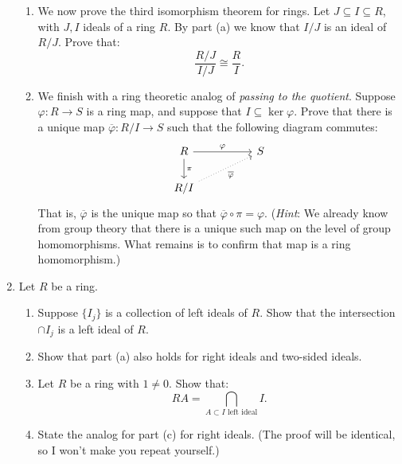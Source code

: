 \documentclass[11pt]{article}
\begin{document}
\begin{enumerate}
{\begin{enumerate}
{\begin{enumerate}
      \item{If $A$ is a subring of $R$, then $I$ is an ideal of $A$ and that $A/I\cong\overline A$.}
      \item{$A$ is a left ideal of $R$ if and only if $\overline A$ is a left ideal of $R/I$.}
      \item{$A$ is a right ideal of $R$ if and only if $\overline A$ is a right ideal of $R/I$.}
      \item{$A$ is an ideal of $R$ if and only if $\overline A$ is an ideal of $R/I$.}
    \end{enumerate}
    }
    \item{We now prove the third isomorphism theorem for rings.  Let $J\subseteq I\subseteq R$, with $J,I$ ideals of a ring $R$.  By part (a) we know that $I/J$ is an ideal of $R/J$.  Prove that:
    \[\frac{R/J}{I/J}\cong\frac{R}{I}.\]
    }
    \item{We finish with a ring theoretic analog of \textit{passing to the quotient}.  Suppose $\varphi:R\to S$ is a ring map, and suppose that $I\subseteq\ker\varphi$.  Prove that there is a unique map $\overline\varphi:R/I\to S$ such that the following diagram commutes:
    \[
    \begin{tikzcd}
      R\ar[rr,"\varphi"]\ar[d,"\pi"]&&S\\
      R/I\ar[urr,dotted,swap,"\overline\varphi"]&&
    \end{tikzcd}
    \]
    That is, $\overline\varphi$ is the unique map so that $\overline\varphi\circ\pi=\varphi$.  (\textit{Hint}: We already know from group theory that there is a unique such map on the level of group homomorphisms.  What remains is to confirm that map is a ring homomorphism.)
    }
  \end{enumerate}
  }
  \item{
  Let $R$ be a ring.
  \begin{enumerate}
    \item{
    Suppose $\{I_j\}$ is a collection of left ideals of $R$.  Show that the intersection $\cap I_j$ is a left ideal of $R$.
    }
    \item{
    Show that part (a) also holds for right ideals and two-sided ideals.
    }
    \item{
    Let $R$ be a ring with $1\not=0$.  Show that:
    \[RA = \bigcap_{A\subset I\text{ left ideal}}I.\]
    }
    \item{
    State the analog for part (c) for right ideals.  (The proof will be identical, so I won't make you repeat yourself.)
    }
  \end{enumerate}
}
\end{enumerate}
\end{document}
